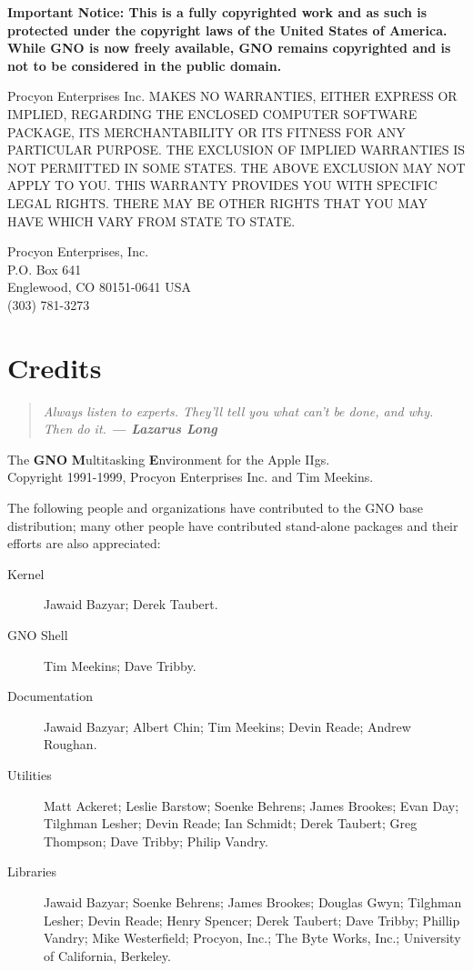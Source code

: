 \documentclass{report}
\begin{document}
\bf
Important Notice:
\rm
This is a fully 
copyrighted work and as such is protected under the copyright
laws of the United States of America.
While GNO is now freely available, GNO remains copyrighted and
is not to be considered in the public domain.

Procyon Enterprises Inc.
MAKES NO
WARRANTIES, EITHER EXPRESS OR IMPLIED, REGARDING THE ENCLOSED
COMPUTER SOFTWARE PACKAGE, ITS MERCHANTABILITY OR ITS FITNESS FOR
ANY PARTICULAR PURPOSE. THE EXCLUSION OF IMPLIED WARRANTIES IS
NOT PERMITTED IN SOME STATES. THE ABOVE EXCLUSION MAY NOT APPLY
TO YOU. THIS WARRANTY PROVIDES YOU WITH SPECIFIC LEGAL RIGHTS.
THERE MAY BE OTHER RIGHTS THAT YOU MAY HAVE WHICH VARY FROM STATE
TO STATE.

Procyon Enterprises, Inc. \\
P.O. Box 641 \\
Englewood, CO 80151-0641 USA \\
(303) 781-3273

\chapter{Credits}

\begin{quote}
\em
Always listen to experts. They'll tell you what can't be done, and why.
Then do it.  \bf --- Lazarus Long \rm
\end{quote}

The {\bf GNO} {\bf M}ultitasking {\bf E}nvironment for the Apple IIgs. \\
Copyright 1991-1999, Procyon Enterprises Inc. and Tim Meekins.

The following people and organizations have contributed to the GNO base
distribution; many other people have contributed stand-alone packages and
their efforts are also appreciated:

\begin{description}

\item[Kernel]
Jawaid Bazyar;
Derek Taubert.

\item[GNO Shell]
Tim Meekins;
Dave Tribby.

\item[Documentation]
Jawaid Bazyar;
Albert Chin;
Tim Meekins; 
Devin Reade;
Andrew Roughan.

\item[Utilities]
Matt Ackeret;
Leslie Barstow;
Soenke Behrens;
James Brookes;
Evan Day;
Tilghman Lesher;
Devin Reade;
Ian Schmidt;
Derek Taubert;
Greg Thompson;
Dave Tribby;
Philip Vandry.

\item[Libraries]
Jawaid Bazyar;
Soenke Behrens;
James Brookes;
Douglas Gwyn;
Tilghman Lesher;
Devin Reade;
Henry Spencer;
Derek Taubert;
Dave Tribby;
Phillip Vandry;
Mike Westerfield;
Procyon, Inc.;
The Byte Works, Inc.;
University of California, Berkeley.

\end{description}
\end{document}
